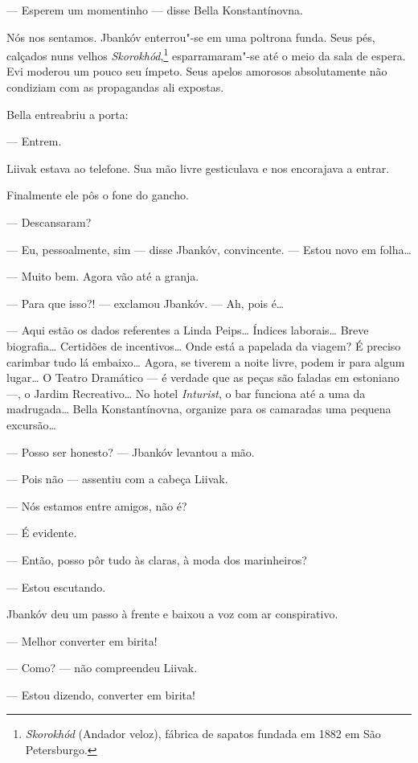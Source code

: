 --- Esperem um momentinho --- disse Bella Konstantínovna.

Nós nos sentamos. Jbankóv enterrou"-se em uma poltrona funda. Seus pés,
calçados nuns velhos \emph{Skorokhód},\footnote{\emph{Skorokhód} (Andador veloz), fábrica de sapatos fundada em 1882 em São Petersburgo.} esparramaram"-se até o meio da
sala de espera. Evi moderou um pouco seu ímpeto. Seus apelos amorosos
absolutamente não condiziam com as propagandas ali expostas.

Bella entreabriu a porta:

--- Entrem.

Liivak estava ao telefone. Sua mão livre gesticulava e nos encorajava a
entrar.

Finalmente ele pôs o fone do gancho.

--- Descansaram?

--- Eu, pessoalmente, sim --- disse Jbankóv, convincente.
--- Estou novo em folha\ldots{}

--- Muito bem. Agora vão até a granja.

--- Para que isso?! --- exclamou Jbankóv. --- Ah,
pois é\ldots{}

--- Aqui estão os dados referentes a Linda Peips\ldots{} Índices
laborais\ldots{} Breve biografia\ldots{} Certidões de incentivos\ldots{} Onde está a
papelada da viagem? É preciso carimbar tudo lá embaixo\ldots{} Agora, se
tiverem a noite livre, podem ir para algum lugar\ldots{} O Teatro Dramático
--- é verdade que as peças são faladas em estoniano ---, o
Jardim Recreativo\ldots{} No hotel \emph{Inturist}, o bar funciona até a uma
da madrugada\ldots{} Bella Konstantínovna, organize para os camaradas uma
pequena excursão\ldots{}

--- Posso ser honesto? --- Jbankóv levantou a mão.

--- Pois não --- assentiu com a cabeça Liivak.

--- Nós estamos entre amigos, não é?

--- É evidente.

--- Então, posso pôr tudo às claras, à moda dos marinheiros?

--- Estou escutando.

Jbankóv deu um passo à frente e baixou a voz com ar conspirativo.

--- Melhor converter em birita!

--- Como? --- não compreendeu Liivak.

--- Estou dizendo, converter em birita!

